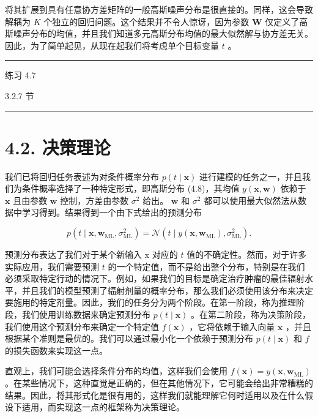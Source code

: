 \documentclass[10pt]{article}
\newcommand{\HRule}{\begin{center}\rule{0.9\linewidth}{0.2mm}\end{center}}
\begin{document}
将其扩展到具有任意协方差矩阵的一般高斯噪声分布是很直接的。同样，这会导致解耦为 \(K\) 个独立的回归问题。这个结果并不令人惊讶，因为参数 \(\mathbf{W}\) 仅定义了高斯噪声分布的均值，并且我们知道多元高斯分布均值的最大似然解与协方差无关。因此，为了简单起见，从现在起我们将考虑单个目标变量 \(t\) 。

\HRule

练习 4.7

3.2.7 节

\HRule

\section*{4.2. 决策理论}

我们已将回归任务表述为对条件概率分布 \(p\left( {t \mid  \mathbf{x}}\right)\) 进行建模的任务之一，并且我们为条件概率选择了一种特定形式，即高斯分布 (4.8)，其均值 \(y\left( {\mathbf{x},\mathbf{w}}\right)\) 依赖于 \(\mathbf{x}\) 且由参数 \(\mathbf{w}\) 控制，方差由参数 \({\sigma }^{2}\) 给出。 \(\mathbf{w}\) 和 \({\sigma }^{2}\) 都可以使用最大似然法从数据中学习得到。结果得到一个由下式给出的预测分布

\[
p\left( {t \mid  \mathbf{x},{\mathbf{w}}_{\mathrm{{ML}}},{\sigma }_{\mathrm{{ML}}}^{2}}\right)  = \mathcal{N}\left( {t \mid  y\left( {\mathbf{x},{\mathbf{w}}_{\mathrm{{ML}}}}\right) ,{\sigma }_{\mathrm{{ML}}}^{2}}\right) . \tag{4.33}
\]

预测分布表达了我们对于某个新输入 \(\mathrm{x}\) 对应的 \(t\) 值的不确定性。然而，对于许多实际应用，我们需要预测 \(t\) 的一个特定值，而不是给出整个分布，特别是在我们必须采取特定行动的情况下。例如，如果我们的目标是确定治疗肿瘤的最佳辐射水平，并且我们的模型预测了辐射剂量的概率分布，那么我们必须使用该分布来决定要施用的特定剂量。因此，我们的任务分为两个阶段。在第一阶段，称为推理阶段，我们使用训练数据来确定预测分布 \(p\left( {t \mid  \mathbf{x}}\right)\) 。在第二阶段，称为决策阶段，我们使用这个预测分布来确定一个特定值 \(f\left( \mathbf{x}\right)\) ，它将依赖于输入向量 \(\mathbf{x}\) ，并且根据某个准则是最优的。我们可以通过最小化一个依赖于预测分布 \(p\left( {t \mid  \mathbf{x}}\right)\) 和 \(f\) 的损失函数来实现这一点。

直观上，我们可能会选择条件分布的均值，这样我们会使用 \(f\left( \mathbf{x}\right)  = y\left( {\mathbf{x},{\mathbf{w}}_{\mathrm{{ML}}}}\right)\) 。在某些情况下，这种直觉是正确的，但在其他情况下，它可能会给出非常糟糕的结果。因此，将其形式化是很有用的，这样我们就能理解它何时适用以及在什么假设下适用，而实现这一点的框架称为决策理论。
\end{document}
